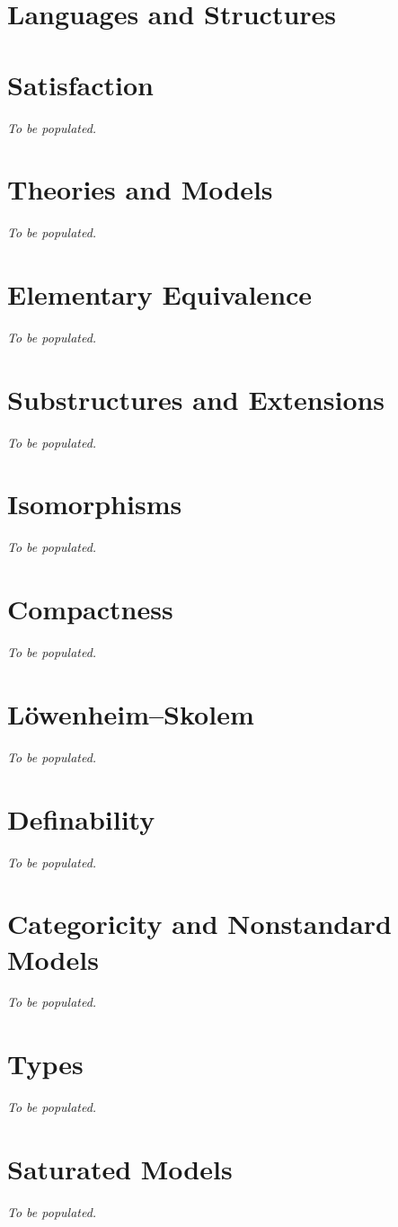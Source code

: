 
\section{Languages and Structures}


\section{Satisfaction}
\textit{To be populated.}

\section{Theories and Models}
\textit{To be populated.}

\section{Elementary Equivalence}
\textit{To be populated.}

\section{Substructures and Extensions}
\textit{To be populated.}

\section{Isomorphisms}
\textit{To be populated.}

\section{Compactness}
\textit{To be populated.}

\section{L\"{o}wenheim--Skolem}
\textit{To be populated.}

\section{Definability}
\textit{To be populated.}

\section{Categoricity and Nonstandard Models}
\textit{To be populated.}

\section{Types}
\textit{To be populated.}

\section{Saturated Models}
\textit{To be populated.}

\clearpage
